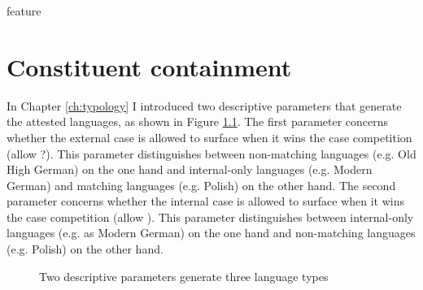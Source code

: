 feature%

\chapter{Constituent containment}\label{ch:relativization}

In Chapter \ref{ch:typology} I introduced two descriptive parameters that generate the attested languages, as shown in Figure \ref{fig:two-parameters}.
The first parameter concerns whether the external case is allowed to surface when it wins the case competition (allow ?). This parameter distinguishes between non-matching languages (e.g. Old High German) on the one hand and internal-only languages (e.g. Modern German) and matching languages (e.g. Polish) on the other hand.
The second parameter concerns whether the internal case is allowed to surface when it wins the case competition (allow ). This parameter distinguishes between internal-only languages (e.g. as Modern German) on the one hand and non-matching languages (e.g. Polish) on the other hand.

\begin{figure}[H]
  \centering
    \footnotesize{
    }
    \caption{Two descriptive parameters generate three language types}
    \label{fig:two-parameters}
\end{figure}

